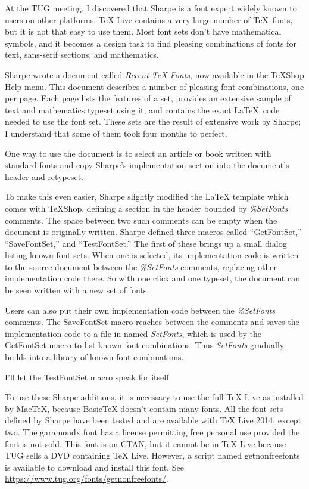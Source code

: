 \documentclass[11pt, oneside]{amsart}
\begin{document}
At the TUG meeting, I discovered that Sharpe is a font expert widely known to users on other platforms.
TeX Live contains a very large number of \TeX\ fonts, but it is not that easy to use them.
Most font sets don't have mathematical symbols, and it becomes a design task to find pleasing combinations of fonts for text, sans-serif sections, and mathematics.

Sharpe wrote a document called {\em Recent TeX Fonts}, now available in the TeXShop Help menu. This document describes a number of pleasing font combinations, one per page. Each page lists the features of a set, provides an extensive sample of text and mathematics typeset using
it, and contains the exact La\TeX\ code needed to use the font set. These sets are the result
of extensive work by Sharpe; I understand that some of them took four months to perfect.

One way to use the document is to select an article or book written with standard fonts and  copy Sharpe's implementation section into the document's header and retypeset. 

To make this even easier, Sharpe slightly modified the LaTeX template which comes with TeXShop, 
defining a  section in the header bounded by {\em \%SetFonts} comments. The space between two such comments can be empty when the document is originally written.  Sharpe defined three
macros called ``GetFontSet,'' ``SaveFontSet,'' and ``TestFontSet.'' The first of these brings up
a small dialog listing known font sets. When one is selected, its implementation code is written to the source document between the {\em \%SetFonts} comments, replacing other implementation code there. So with one click and one typeset, the document can be seen written with a new set of fonts.

Users can also put their own implementation code between the  {\em \%SetFonts} comments.
The SaveFontSet macro reaches between the comments and saves the implementation code to a file in  named {\em SetFonts}, which is used by the GetFontSet macro to list known font combinations. Thus {\em SetFonts}  gradually builds into a library of known font combinations. 

I'll let the TestFontSet macro speak for itself.

To use these Sharpe additions, it is necessary to use the full TeX Live as installed by MacTeX,
because BasicTeX doesn't contain many fonts. All the font sets defined by Sharpe have been
tested and are available with TeX Live 2014, except two. The garamondx font has a license permitting free personal use provided the font is not sold. This font is on CTAN, but it cannot
be in TeX Live because TUG sells a DVD containing TeX Live. However, a script named getnonfreefonts is available to download and install this font. See \url{https://www.tug.org/fonts/getnonfreefonts/}.
\end{document}
